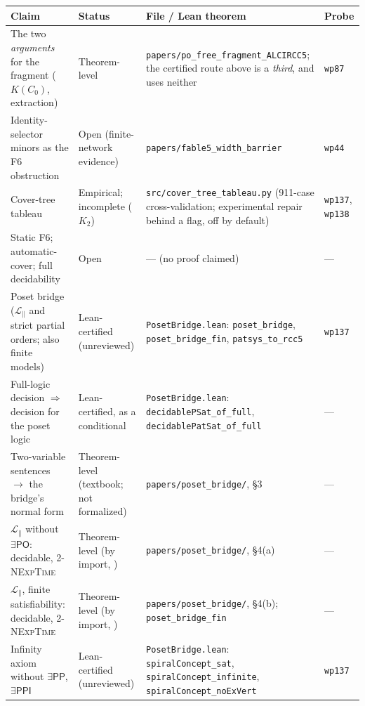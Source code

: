 \documentclass[11pt]{article}
\newcommand{\PO}{\mathsf{PO}}
\newcommand{\PP}{\mathsf{PP}}
\newcommand{\PPI}{\mathsf{PPI}}
\newcommand{\code}[1]{\texttt{#1}}
\theoremstyle{plain}
\theoremstyle{definition}
\begin{document}
\begin{table}[!htbp]
\centering
\footnotesize
\renewcommand{\arraystretch}{1.2}
\begin{tabular}{@{}L{0.235\textwidth}L{0.115\textwidth}L{0.40\textwidth}L{0.11\textwidth}@{}}
\toprule
\textbf{Claim} & \textbf{Status} & \textbf{File / Lean theorem} & \textbf{Probe}\\
\midrule
The two \emph{arguments} for the fragment ($K(C_0)$, extraction) & Theorem-level & \texttt{papers/po\_free\_fragment\_ALCIRCC5}; the certified route above is a \emph{third}, and uses neither & \texttt{wp87}\\
Identity-selector minors as the F6 obstruction & Open (finite-network evidence) & \texttt{papers/fable5\_width\_barrier} & \texttt{wp44}\\
Cover-tree tableau & Empirical; incomplete ($K_2$) & \texttt{src/cover\_tree\_tableau.py} (911-case cross-validation; experimental repair behind a flag, off by default) & \texttt{wp137}, \texttt{wp138}\\
Static F6; automatic-cover; full decidability & Open & --- (no proof claimed) & ---\\
\addlinespace
Poset bridge ($\mathcal L_{\parallel}$ and strict partial orders; also finite models) & Lean-certified (unreviewed) & \texttt{PosetBridge.lean}: \code{poset\_bridge}, \code{poset\_bridge\_fin}, \code{patsys\_to\_rcc5} & \texttt{wp137}\\
Full-logic decision $\Rightarrow$ decision for the poset logic & Lean-certified, as a conditional & \texttt{PosetBridge.lean}: \code{decidablePSat\_of\_full}, \code{decidablePatSat\_of\_full} & ---\\
Two-variable sentences $\to$ the bridge's normal form & Theorem-level (textbook; not formalized) & \texttt{papers/poset\_bridge/}, \S3 & ---\\
$\mathcal L_{\parallel}$ without $\exists\PO$: decidable, 2-\textsc{NExpTime} & Theorem-level (by import, \cite{SzwastTendera2018}) & \texttt{papers/poset\_bridge/}, \S4(a) & ---\\
$\mathcal L_{\parallel}$, finite satisfiability: decidable, 2-\textsc{NExpTime} & Theorem-level (by import, \cite{PrattHartmann2018}) & \texttt{papers/poset\_bridge/}, \S4(b); \code{poset\_bridge\_fin} & ---\\
Infinity axiom without $\exists\PP$, $\exists\PPI$ & Lean-certified (unreviewed) & \texttt{PosetBridge.lean}: \code{spiralConcept\_sat}, \code{spiralConcept\_infinite}, \code{spiralConcept\_noExVert} & \texttt{wp137}\\

\end{tabular}
\end{table}
\end{document}
